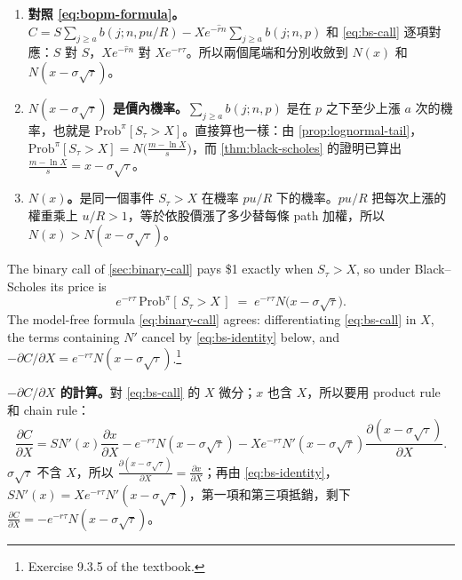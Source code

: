 \begin{remark}
	\begin{enumerate}[(1),nosep]
		\item \textbf{對照 \eqref{eq:bopm-formula}。}$C=S\sum_{j\ge a}b(j;n,pu/R)-Xe^{-\hat{r}n}\sum_{j\ge a}b(j;n,p)$ 和 \eqref{eq:bs-call} 逐項對應：$S$ 對 $S$，$Xe^{-\hat{r}n}$ 對 $Xe^{-r\tau}$。所以兩個尾端和分別收斂到 $N(x)$ 和 $N(x-\sigma\sqrt{\tau})$。
		\item \textbf{$N(x-\sigma\sqrt{\tau})$ 是價內機率。}$\sum_{j\ge a}b(j;n,p)$ 是在 $p$ 之下至少上漲 $a$ 次的機率，也就是 $\mathrm{Prob}^{\pi}[S_{\tau}>X]$。直接算也一樣：由 \autoref{prop:lognormal-tail}，$\mathrm{Prob}^{\pi}[S_{\tau}>X]=N\bigl(\frac{m-\ln X}{s}\bigr)$，而 \autoref{thm:black-scholes} 的證明已算出 $\frac{m-\ln X}{s}=x-\sigma\sqrt{\tau}$。
		\item \textbf{$N(x)$。}是同一個事件 $S_{\tau}>X$ 在機率 $pu/R$ 下的機率。$pu/R$ 把每次上漲的權重乘上 $u/R>1$，等於依股價漲了多少替每條 path 加權，所以 $N(x)>N(x-\sigma\sqrt{\tau})$。
	\end{enumerate}
\end{remark}

\begin{eg}
	\label{eg:bs-binary}
	The binary call of \autoref{sec:binary-call} pays \$1 exactly when $S_{\tau}>X$, so under Black--Scholes its price is
	\[
		e^{-r\tau}\,\mathrm{Prob}^{\pi}[\,S_{\tau}>X\,] \;=\; e^{-r\tau}N\bigl(x-\sigma\sqrt{\tau}\bigr) .
	\]
	The model-free formula \eqref{eq:binary-call} agrees: differentiating \eqref{eq:bs-call} in $X$, the terms containing $N'$ cancel by \eqref{eq:bs-identity} below, and $-\partial C/\partial X=e^{-r\tau}N(x-\sigma\sqrt{\tau})$.\footnote{Exercise 9.3.5 of the textbook.}
\end{eg}

\begin{remark}[補充]
	\textbf{$-\partial C/\partial X$ 的計算。}對 \eqref{eq:bs-call} 的 $X$ 微分；$x$ 也含 $X$，所以要用 product rule 和 chain rule：
	\[
		\frac{\partial C}{\partial X}=SN'(x)\frac{\partial x}{\partial X}-e^{-r\tau}N(x-\sigma\sqrt{\tau})-Xe^{-r\tau}N'(x-\sigma\sqrt{\tau})\frac{\partial(x-\sigma\sqrt{\tau})}{\partial X} .
	\]
	$\sigma\sqrt{\tau}$ 不含 $X$，所以 $\frac{\partial(x-\sigma\sqrt{\tau})}{\partial X}=\frac{\partial x}{\partial X}$；再由 \eqref{eq:bs-identity}，$SN'(x)=Xe^{-r\tau}N'(x-\sigma\sqrt{\tau})$，第一項和第三項抵銷，剩下 $\frac{\partial C}{\partial X}=-e^{-r\tau}N(x-\sigma\sqrt{\tau})$。
\end{remark}
\suppend

